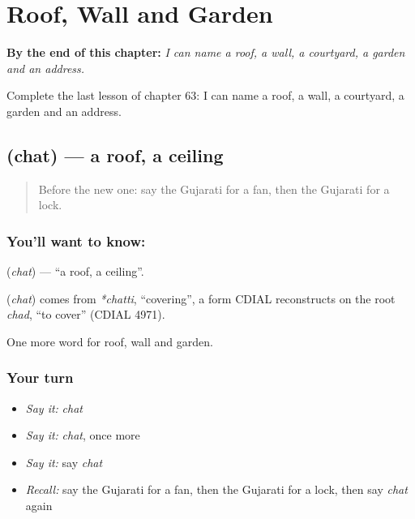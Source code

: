 
\chapter{Roof, Wall and Garden}
\label{ch:gu-roof-wall-and-garden}

\begin{chapteropening}
\textbf{By the end of this chapter:} \emph{I can name a roof, a wall, a courtyard, a garden and an address.}

Complete the last lesson of chapter 63: I can name a roof, a wall, a courtyard, a garden and an address.
\end{chapteropening}

\section[\texorpdfstring{\gu{છત} (chat)}{છત (chat)}]{ (chat) — a roof, a ceiling}

\label{lesson:GU-C63-roof}



\begin{quote}
Before the new one: say the Gujarati for a fan, then the Gujarati for a lock.
\end{quote}

\subsection*{You'll want to know: }
\textbf{} (\emph{chat}) — \textquotedblleft{}a roof, a ceiling\textquotedblright{}.

\begin{cousinweb}
\textbf{} (\emph{chat}) comes from \emph{*chatti}, \textquotedblleft{}covering\textquotedblright{}, a form CDIAL reconstructs on the root \emph{chad}, \textquotedblleft{}to cover\textquotedblright{} (CDIAL 4971).
\end{cousinweb}

\begin{grammarlens}[title={What you've built}]
One more word for roof, wall and garden.
\end{grammarlens}

\subsection*{Your turn}
\begin{itemize}
\raggedright
  \item \emph{Say it:} \emph{chat}
  \item \emph{Say it:} \emph{chat}, once more
  \item \emph{Say it:} say \emph{chat}
  \item \emph{Recall:} say the Gujarati for a fan, then the Gujarati for a lock, then say \emph{chat} again
\end{itemize}

